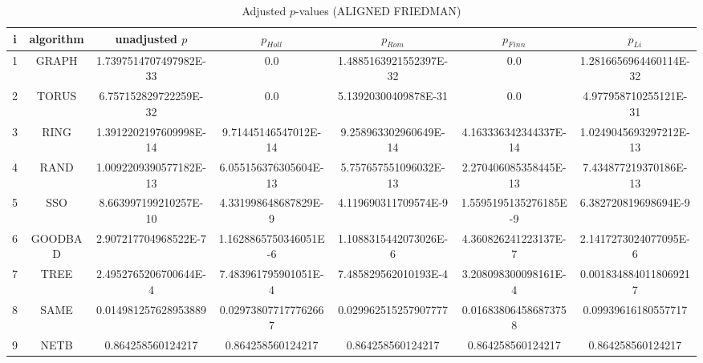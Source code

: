 \documentclass[a4paper,10pt]{article}
\begin{document}
\begin{landscape}
\begin{table}[!htp]
\centering\scriptsize
\caption{Adjusted $p$-values (ALIGNED FRIEDMAN)}
\begin{tabular}{ccccccc}
i&algorithm&unadjusted $p$&$p_{Holl}$&$p_{Rom}$&$p_{Finn}$&$p_{Li}$\\
\hline
1& GRAPH&1.7397514707497982E-33&0.0&1.4885163921552397E-32&0.0&1.2816656964460114E-32\\
2& TORUS&6.757152829722259E-32&0.0&5.13920300409878E-31&0.0&4.977958710255121E-31\\
3& RING&1.3912202197609998E-14&9.71445146547012E-14&9.258963302960649E-14&4.163336342344337E-14&1.0249045693297212E-13\\
4& RAND&1.0092209390577182E-13&6.055156376305604E-13&5.757657551096032E-13&2.270406085358445E-13&7.434877219370186E-13\\
5& SSO&8.663997199210257E-10&4.331998648687829E-9&4.119690311709574E-9&1.5595195135276185E-9&6.382720819698694E-9\\
6& GOODBAD&2.907217704968522E-7&1.1628865750346051E-6&1.1088315442073026E-6&4.360826241223137E-7&2.1417273024077095E-6\\
7& TREE&2.4952765206700644E-4&7.483961795901051E-4&7.485829562010193E-4&3.208098300098161E-4&0.0018348840118069217\\
8& SAME&0.014981257628953889&0.029738077177762667&0.029962515257907777&0.016838064586873758&0.09939616180557717\\
9& NETB&0.864258560124217&0.864258560124217&0.864258560124217&0.864258560124217&0.864258560124217\\
\hline
\end{tabular}
\end{table}


\newpage


\end{landscape}
\end{document}
